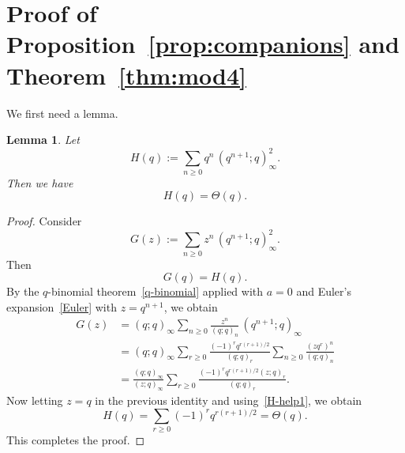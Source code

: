 \documentclass[reqno]{amsart}
\theoremstyle{plain}
\newtheorem{lemma}{Lemma}
\theoremstyle{definition}
\theoremstyle{remark}
\numberwithin{equation}{section}
\newcommand{\qpoch}[2]{(#1;#2)_\infty}
\newcommand{\qpochn}[3]{(#1;#2)_{#3}}
\begin{document}
\section{Proof of Proposition~\ref{prop:companions} and Theorem~\ref{thm:mod4}}\label{sec:proof-thm1}
%
We first need a lemma.
%
\begin{lemma}\label{lem:H-theta}
Let
\[
H(q):=\sum_{n\ge 0} q^n\,\qpoch{q^{n+1}}{q}^{2}.
\]
Then we have
\[
H(q)=\Theta(q).
\]
\end{lemma}

\begin{proof}
Consider
\[
G(z):=\sum_{n\ge 0} z^n\,\qpoch{q^{n+1}}{q}^{2}.
\]
Then
\begin{equation}\label{H-help1}
G(q) = H(q).
\end{equation}
By the $q$-binomial theorem~\eqref{q-binomial}
applied with $a=0$ and Euler's expansion~\eqref{Euler} with $z=q^{n+1}$, we obtain
\begin{align*}
G(z)
&=\qpoch{q}{q}\sum_{n\ge 0}\frac{z^n}{\qpochn{q}{q}{n}}\,\qpoch{q^{n+1}}{q} \\
&=\qpoch{q}{q}\sum_{r\ge 0}\frac{(-1)^r q^{r(r+1)/2}}{\qpochn{q}{q}{r}}
   \sum_{n\ge 0}\frac{(zq^r)^n}{\qpochn{q}{q}{n}} \\
&=\frac{\qpoch{q}{q}}{\qpoch{z}{q}}
  \sum_{r\ge 0}\frac{(-1)^r q^{r(r+1)/2}\qpochn{z}{q}{r}}{\qpochn{q}{q}{r}}.
\end{align*}
Now letting $z=q$ in the previous identity and using~\eqref{H-help1}, we obtain
\[
H(q)=\sum_{r\ge 0}(-1)^r q^{r(r+1)/2}=\Theta(q).
\]
This completes the proof.
\end{proof}
\end{document}
